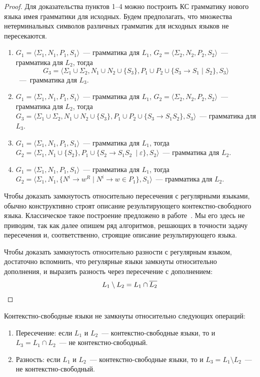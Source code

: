 \begin{proof}
    Для доказательства пунктов 1--4 можно построить КС грамматику нового языка имея грамматики для исходных.
    Будем предполагать, что множества нетерминальных символов различных грамматик для исходных языков не пересекаются.
    \begin{enumerate}
        \item $G_1=\langle\Sigma_1,N_1,P_1,S_1\rangle$~--- грамматика для $L_1$, $G_2=\langle\Sigma_2,N_2,P_2,S_2\rangle$~--- грамматика для $L_2$, тогда
              \[G_3=\langle\Sigma_1 \cup \Sigma_2, N_1 \cup N_2 \cup \{S_3\}, P_1 \cup P_2 \cup \{S_3 \to S_1 \mid S_2\} ,S_3\rangle\]~---~грамматика для $L_3$.
        \item $G_1=\langle\Sigma_1,N_1,P_1,S_1\rangle$~--- грамматика для $L_1$, $G_2=\langle\Sigma_2,N_2,P_2,S_2\rangle$~--- грамматика для $L_2$, тогда $G_3=\langle\Sigma_1 \cup \Sigma_2, N_1 \cup N_2 \cup \{S_3\}, P_1 \cup P_2 \cup \{S_3 \to S_1 S_2\} ,S_3\rangle$~--- грамматика для $L_3$.
        \item $G_1=\langle\Sigma_1,N_1,P_1,S_1\rangle$~--- грамматика для $L_1$, тогда $G_2=\langle\Sigma_1, N_1 \cup \{S_2\}, P_1 \cup \{S_2 \to S_1 S_2\ \mid \varepsilon\}, S_2\rangle$~--- грамматика для $L_2$.
        \item $G_1=\langle\Sigma_1,N_1,P_1,S_1\rangle$~--- грамматика для $L_1$, тогда $G_2=\langle\Sigma_1, N_1, \{N^i \to w^R \mid N^i \to w \in P_1 \}, S_1\rangle$~--- грамматика для $L_2$.
    \end{enumerate}

    Чтобы доказать замкнутость относительно пересечения с регулярными языками, обычно конструктивно строят описание результирующего контекстно-свободного языка.
    Классическое такое построение предложено в работе~.
    Мы его здесь не приводим, так как далее опишем ряд алгоритмов, решающих в точности задачу пересечения и, соответственно, строящие описание результирующего языка.

    Чтобы доказать замкнутость относительно разности с регулярным языком, достаточно вспомнить, что регулярные языки замкнуты относительно дополнения, и выразить разность через пересечение с дополнением:
    \[L_1 \setminus L_2 = L_1 \cap \overline{L_2} \qedhere\]
\end{proof}

\begin{theorem}
    Контекстно-свободные языки не замкнуты относительно следующих операций:
    \begin{enumerate}
        \item Пересечение: если $L_1$ и $L_2$~--- контекстно-свободные языки, то и $L_3 = L_1 \cap L_2$~--- не контекстно-свободный.
        \item Разность: если $L_1$ и $L_2$~--- контекстно-свободные языки, то и $L_3 = L_1 \setminus L_2$~--- не контекстно-свободный.
    \end{enumerate}
\end{theorem}

